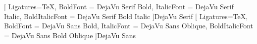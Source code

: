 \usepackage{amsmath}
\usepackage{amssymb}
\usepackage{amsfonts}
\usepackage{graphicx}
\usepackage{mathrsfs}
\usepackage{xcolor}
\usepackage{newunicodechar}
\usepackage{mathtools}
\usepackage{longtable}
\usepackage{fontspec}
\usepackage[main=russian]{babel}
\usepackage{microtype}

\usepackage{unicode-math}

[
  Ligatures=TeX,
  BoldFont = DejaVu Serif Bold,
  ItalicFont = DejaVu Serif Italic,
  BoldItalicFont = DejaVu Serif Bold Italic
]{DejaVu Serif}
[
  Ligatures=TeX,
  BoldFont = DejaVu Sans Bold,
  ItalicFont = DejaVu Sans Oblique,
  BoldItalicFont = DejaVu Sans Bold Oblique
]{DejaVu Sans}


\usepackage{hyperref}
\makeatletter
\let\oldhypertarget\hypertarget
\renewcommand{\hypertarget}[2]{\oldhypertarget{#1}{\texorpdfstring{#2}{#2}}}
\makeatother
